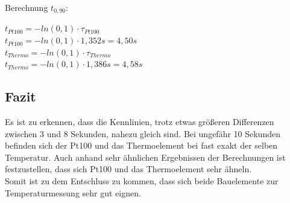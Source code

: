 \documentclass[a4paper,11pt,oneside]{article}
\begin{document}
\newpage

Berechnung $t_{0,90}$:\\

\begin{center}
$t_{Pt100} = -ln(0,1)\cdot \tau_{Pt100}$\\
$t_{Pt100} = -ln(0,1)\cdot 1,352s = 4,50s$\\
\vspace{0.5cm}
$t_{Thermo} = -ln(0,1)\cdot \tau_{Thermo}$\\
$t_{Thermo} = -ln(0,1)\cdot 1,386s = 4,58s$
\end{center}


\subsection{Fazit}
Es ist zu erkennen, dass die Kennlinien, trotz etwas größeren Differenzen zwischen 3 und 8 Sekunden, nahezu gleich sind. Bei ungefähr 10 Sekunden befinden sich der Pt100 und das Thermoelement bei fast exakt der selben Temperatur. Auch anhand sehr ähnlichen Ergebnissen der Berechnungen ist festzustellen, dass sich Pt100 und das Thermoelement sehr ähneln. \\
Somit ist zu dem Entschluss zu kommen, dass sich beide Bauelemente zur Temperaturmessung sehr gut eignen. 
\end{document}
